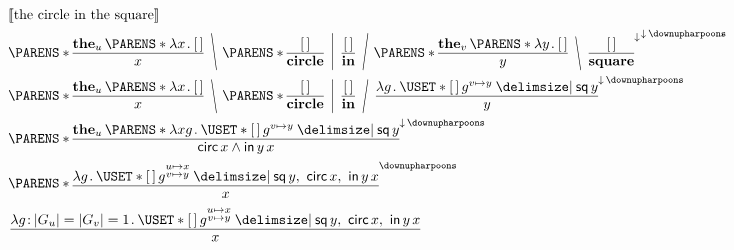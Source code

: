 \documentclass[10pt,fleqn]{article}
\begin{document}
\begin{minipage}[t]{0.5\textwidth} %
\begin{align*} %
  &
  \sv{\textrm{the circle in the square}} \\
  &
  \p{%
    \bitt{\textbf{the}_u\,\p{\l x \dt \hole}}{x}
    \BSL{%
    \p{%
      \bitt{\hole}{\textbf{circle}}
      \MSL{%
      \bitt{\hole}{\textbf{in}}
      \FSL{%
      \p{%
        \bitt{\textbf{the}_v\,\p{\l y \dt \hole}}{y}
        \BSL{%
        \bitt{\hole}{\textbf{square}}
        }
      }^{\dnar} } }
    } }
  }^{\dnar\,\reset} \\
  &
  \p{%
    \bitt{\textbf{the}_u\,\p{\l x \dt \hole}}{x}
    \BSL{%
    \p{%
      \bitt{\hole}{\textbf{circle}}
      \MSL{%
      \bitt{\hole}{\textbf{in}}
      \FSL{%
      \bitt{%
        \l g \dt \uset{\hole\,g^{v\mapsto y} \giv \cn{sq}\,y}
      }{y}
      } }
    } }
  }^{\dnar\,\reset} \\
  &
  \p{%
    \bitt{%
      \textbf{the}_u\,\p{%
        \l xg \dt \uset{\hole\,g^{v\mapsto y} \giv \cn{sq}\,y}
      }
    }{%
      \cn{circ}\,x \land \cn{in}\,y\,x
    }
  }^{\dnar\,\reset} \\
  &
  \p{%
    \bitt{%
      \l g \dt
        \uset{%
          \hole\,g^{\substack{u\mapsto x\\ v\mapsto y}}
        \giv
          \cn{sq}\,y,\ \cn{circ}\,x,\ \cn{in}\,y\,x
        }
    }{x}
  }^{\reset} \\
  &
  \bitt{%
    \l g \col |G_u| = |G_v| = 1 \dt
      \uset{%
        \hole\,g^{\substack{u\mapsto x\\ v\mapsto y}}
      \giv
        \cn{sq}\,y,\ \cn{circ}\,x,\ \cn{in}\,y\,x
      }
  }{x}
\end{align*}
\end{minipage}
%
%
\end{document}
